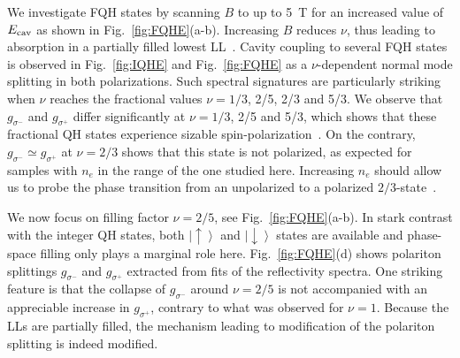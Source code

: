 \documentclass[prl,twocolumn,10pt,showpacs,superscriptaddress,longbibliography,footnoteinbib]{revtex4-1}
\begin{document}
We investigate FQH states by scanning $B$ to up to 5~T for an increased value of $E_{\rm cav}$ as shown in Fig.~\ref{fig:FQHE}(a-b). Increasing $B$ reduces $\nu$, thus leading to absorption in a partially filled lowest LL~\cite{Goldberg1990,Yusa2001,Byszewski2006}. Cavity coupling to several FQH states is observed in Fig.~\ref{fig:IQHE} and Fig.~\ref{fig:FQHE} as a $\nu$-dependent normal mode splitting in both polarizations. Such spectral signatures are particularly striking when $\nu$ reaches the fractional values $\nu = 1/3$, 2/5, 2/3 and 5/3. We observe that $g_{\sigma^-}$ and $g_{\sigma^+}$ differ significantly at $\nu = 1/3$, 2/5 and 5/3, which shows that these fractional QH states experience sizable spin-polarization~\cite{Supplemental}. On the contrary, $g_{\sigma^-} \simeq g_{\sigma^+}$ at $\nu=2/3$ shows that this state is not polarized, as expected for samples with $n_e$ in the range of the one studied here. Increasing $n_e$ should allow us to probe the phase transition from an unpolarized to a polarized $2/3$-state~\cite{Eisenstein1990,Smolka2014}.

We now focus on filling factor $\nu=2/5$, see Fig.~\ref{fig:FQHE}(a-b). In stark contrast with the integer QH states, both $\left | \uparrow \right >$ and $\left | \downarrow \right >$ states are available and phase-space filling only plays a marginal role here. Fig.~\ref{fig:FQHE}(d) shows polariton splittings $g_{\sigma^-}$ and $g_{\sigma^+}$ extracted from fits of the reflectivity spectra. One striking feature is that the collapse of $g_{\sigma^-}$ around $\nu=2/5$ is not accompanied with an appreciable increase in $g_{\sigma^+}$, contrary to what was observed for $\nu=1$. Because the LLs are partially filled, the mechanism leading to modification of the polariton splitting is indeed modified.
\end{document}
